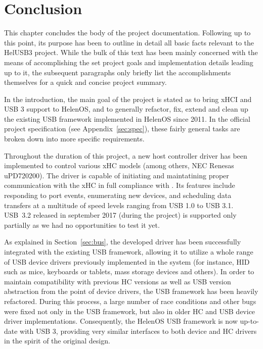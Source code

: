 \chapter*{Conclusion}

This chapter concludes the body of the project documentation. Following up to
this point, its purpose has been to outline in detail all basic facts relevant
to the HelUSB3 project. While the bulk of this text has been mainly concerned
with the means of accomplishing the set project goals and implementation details
leading up to it, the subsequent paragraphs only briefly list the
accomplishments themselves for a quick and concise project summary.

In the introduction, the main goal of the project is stated as to bring xHCI and
USB 3 support to HelenOS, and to generally refactor, fix, extend and clean up the
existing USB framework implemented in HelenOS since 2011. In the official
project specification (see Appendix~\ref{sec:spec}), these fairly general tasks
are broken down into more specific requirements.

Throughout the duration of this project, a new host controller driver has been
implemented to control various xHC models (among others, NEC Renesas
uPD720200). The driver is capable of initiating and maintatining proper
communication with the xHC in full compliance with \cite{xhci}. Its features
include responding to port events, enumerating new devices, and scheduling data
transfers at a multitude of speed levels ranging from USB 1.0 to USB 3.1.
USB~3.2 released in september 2017 (during the project) is supported only
partially as we had no opportunities to test it yet.

As explained in Section~\ref{sec:bus}, the developed driver has been successfully
integrated with the existing USB framework, allowing it to utilize a whole range
of USB device drivers previously implemented in the system (for instance, HID
such as mice, keyboards or tablets, mass storage devices and others). In order
to maintain compatibility with previous HC versions as well as USB version
abstraction from the point of device drivers, the USB framework has been heavily
refactored. During this process, a large number of race conditions and other
bugs were fixed not only in the USB framework, but also in older HC and USB
device driver implementations. Consequently, the HelenOS USB framework is now
up-to-date with USB 3, providing very similar interfaces to both device and HC
drivers in the spirit of the original design.


